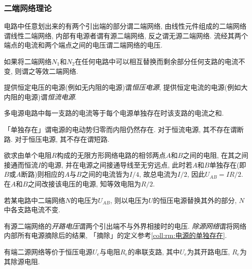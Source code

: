 \documentclass[../Electromagnetism.tex]{subfiles}
\begin{document}

\subsubsection{二端网络理论} %
\label{ssub:二端网络理论}

\begin{definition}[二端网络]
	电路中任意划出来的有两个引出端的部分谓二端网络, 由线性元件组成的二端网络谓线性二端网络, 内部有电源者谓有源二端网络, 反之谓无源二端网络. 流经其两个端点的电流和两个端点之间的电压谓二端网络的电压.
\end{definition}
\begin{definition}[等效二端网络]
	如果将二端网络$N_1$和$N_2$在任何电路中可以相互替换而剩余部分任何支路的电流不变, 则谓之等效二端网络.
\end{definition}
提供恒定电压的电源(例如无内阻的电源)谓\emph{恒压电源}, 提供恒定电流的电源(例如大内阻的电源)谓\emph{恒流电源}.
\begin{finale}
	\begin{theorem}[电路的叠加定理]
		多电源电路中每一支路的电流等于每个电源单独存在时该支路的电流之和.
	\end{theorem}
\end{finale}
\begin{remark}
	\label{rm:电源的单独存在}
	「单独存在」谓电源的电动势归零而内阻仍然存在. 对于恒流电源, 其不存在谓断路. 对于恒压电源, 其不存在谓短路.
\end{remark}
\begin{ex}
	欲求由单个电阻$R$构成的无限方形网络电路的相邻两点$A$和$B$之间的电阻, 在其之间接通而恒流$I$的电源, 并在电源之间接通导线至无穷远点, 此时若$A$和$B$单独存在(即$B$或$A$断路)则相应的$A$与$B$之间的电流皆为$I/4$, 故总电流为$I/2$, 因此$U_{AB} = IR/2$. 在$A$和$B$之间改接该电压的电源, 知等效电阻为$R/2$.
\end{ex}
\begin{finale}
	\begin{theorem}[电路的替代定理]
		若某电路中二端网络$N$的电压为$U_{AB}$, 则以电压为$U$的恒压电源替换其外的部分, $N$中各支路电流不变.
	\end{theorem}
\end{finale}
有源二端网络的\emph{开路电压}谓两个引出端不与外界相接时的电压. \emph{除源网络}谓将网络内部所有电源摘除后的结果, 「摘除」的定义参考\cref{coll:rm:电源的单独存在}.
\begin{finale}
	\begin{theorem}[Thevenin定理]
		有端二源网络等价于恒压电源$U_e$与电阻$R_e$的串联支路, 其中$U_e$为其开路电压, $R_e$为其除源电阻.
	\end{theorem}
\end{finale}
\end{document}
